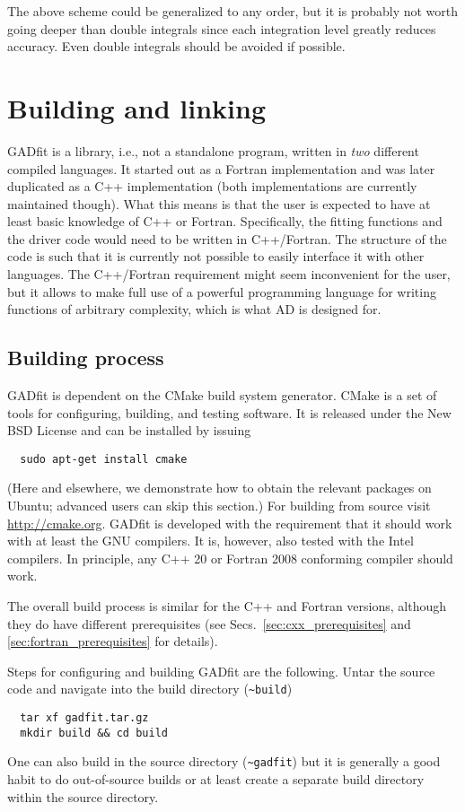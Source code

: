 \documentclass{article}
\begin{document}
The above scheme could be generalized to any order, but it is probably not worth going deeper than double integrals since each integration level greatly reduces accuracy. Even double integrals should be avoided if possible.

\section{Building and linking}

GADfit is a library, i.e., not a standalone program, written in \textit{two} different compiled languages. It started out as a Fortran implementation and was later duplicated as a C++ implementation (both implementations are currently maintained though). What this means is that the user is expected to have at least basic knowledge of C++ or Fortran. Specifically, the fitting functions and the driver code would need to be written in C++/Fortran. The structure of the code is such that it is currently not possible to easily interface it with other languages. The C++/Fortran requirement might seem inconvenient for the user, but it allows to make full use of a powerful programming language for writing functions of arbitrary complexity, which is what AD is designed for.

\subsection{Building process}

GADfit is dependent on the CMake build system generator. CMake is a set of tools for configuring, building, and testing software. It is released under the New BSD License and can be installed by issuing
\begin{verbatim}
  sudo apt-get install cmake
\end{verbatim}
(Here and elsewhere, we demonstrate how to obtain the relevant packages on Ubuntu; advanced users can skip this section.) For building from source visit \url{http://cmake.org}. GADfit is developed with the requirement that it should work with at least the GNU compilers. It is, however, also tested with the Intel compilers. In principle, any C++ 20 or Fortran 2008 conforming compiler should work.

The overall build process is similar for the C++ and Fortran versions, although they do have different prerequisites (see Secs.~\ref{sec:cxx_prerequisites} and \ref{sec:fortran_prerequisites} for details).

Steps for configuring and building GADfit are the following. Untar the source code and navigate into the build directory (\verb+~build+)
\begin{verbatim}
  tar xf gadfit.tar.gz
  mkdir build && cd build
\end{verbatim}
One can also build in the source directory (\verb+~gadfit+) but it is generally a good habit to do out-of-source builds or at least create a separate build directory within the source directory.
\end{document}
